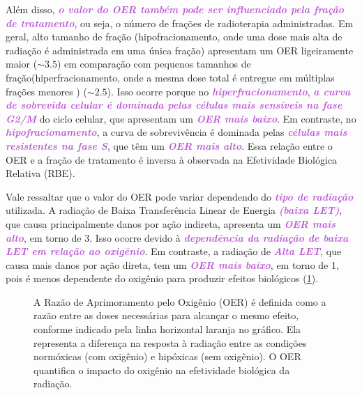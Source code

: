 \documentclass[11pt,a4paper]{article}
\begin{document}
	Além disso, \textcolor{MediumOrchid}{\textbf{\textit{o valor do OER também pode ser influenciado pela fração de tratamento}}}, ou seja, o número de frações de radioterapia administradas. Em geral, alto tamanho de fração (hipofracionamento, onde uma dose mais alta de radiação é administrada em uma única fração) apresentam um OER ligeiramente maior ($\sim 3.5$) em comparação com pequenos tamanhos de fração(hiperfracionamento, onde a mesma dose total é entregue em múltiplas frações menores ) ($\sim 2.5$). Isso ocorre porque no \textcolor{MediumOrchid}{\textbf{\textit{hiperfracionamento}}}, \textcolor{MediumOrchid}{\textbf{\textit{a curva de sobrevida celular é dominada pelas células mais sensíveis na fase G2/M}}} do ciclo celular, que apresentam um \textcolor{MediumOrchid}{\textbf{\textit{OER mais baixo}}}. Em contraste, no \textcolor{MediumOrchid}{\textbf{\textit{hipofracionamento}}}, a curva de sobrevivência é dominada pelas \textcolor{MediumOrchid}{\textbf{\textit{células mais resistentes na fase S}}}, que têm um \textcolor{MediumOrchid}{\textbf{\textit{OER mais alto}}}. Essa relação entre o OER e a fração de tratamento é inversa à observada na Efetividade Biológica Relativa (RBE).

	Vale ressaltar que o valor do OER pode variar dependendo do \textcolor{MediumOrchid}{\textbf{\textit{tipo de radiação}}} utilizada. A radiação de Baixa Transferência Linear de Energia \textcolor{MediumOrchid}{\textbf{\textit{(baixa LET)}}}, que causa principalmente danos por ação indireta, apresenta um \textcolor{MediumOrchid}{\textbf{\textit{OER mais alto}}}, em torno de 3. Isso ocorre devido à \textcolor{MediumOrchid}{\textbf{\textit{dependência da radiação de baixa LET em relação ao oxigênio}}}. Em contraste, a radiação de \textcolor{MediumOrchid}{\textbf{\textit{Alta LET}}}, que causa mais danos por ação direta, tem um \textcolor{MediumOrchid}{\textbf{\textit{OER mais baixo}}}, em torno de 1, pois é menos dependente do oxigênio para produzir efeitos biológicos (\ref{fig:OER}). 

	\begin{figure}[h]
		\centering
		\caption{A Razão de Aprimoramento pelo Oxigênio (OER) é definida como a razão entre as doses necessárias para alcançar o mesmo efeito, conforme indicado pela linha horizontal laranja no gráfico. Ela representa a diferença na resposta à radiação entre as condições normóxicas (com oxigênio) e hipóxicas (sem oxigênio). O OER quantifica o impacto do oxigênio na efetividade biológica da radiação.}
		\label{fig:OER}
	\end{figure}
\end{document}
